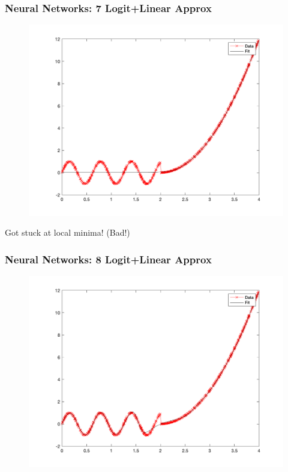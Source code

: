 \documentclass{beamer}
\begin{document}
\begin{frame}
\frametitle[alignment=center]{Neural Networks: 7 Logit+Linear Approx}
\begin{figure}
\includegraphics[scale=0.5]{NN_Example/Fig_Shallow_7.png}
\end{figure}
Got stuck at local minima!  (Bad!)
\end{frame}

\begin{frame}
\frametitle[alignment=center]{Neural Networks: 8 Logit+Linear Approx}
\begin{figure}
\includegraphics[scale=0.5]{NN_Example/Fig_Shallow_8.png}
\end{figure}
\end{frame}
\end{document}
